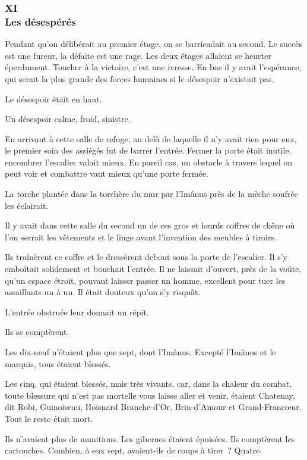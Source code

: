 \documentclass[french,twoside]{book} %
\begin{document}
 \subsubsection[{XI. Les désespérés}]{XI \\
Les désespérés}
\label{p3l4c11}
\noindent Pendant qu’on délibérait au premier étage, on se barricadait au second. Le succès est une fureur, la défaite est une rage. Les deux étages allaient se heurter éperdument. Toucher à la victoire, c’est une ivresse. En bas il y avait l’espérance, qui serait la plus grande des forces humaines si le désespoir n’existait pas.\par
Le désespoir était en haut.\par
Un désespoir calme, froid, sinistre.\par
En arrivant à cette salle de refuge, au delà de laquelle il n’y avait rien pour eux, le premier soin des assiégés fut de barrer l’entrée. Fermer la porte était inutile, encombrer l’escalier valait mieux. En pareil cas, un obstacle à travers lequel on peut voir et combattre vaut mieux qu’une porte fermée.\par
La torche plantée dans la torchère du mur par l’Imânus près de la mèche soufrée les éclairait.\par
Il y avait dans cette salle du second un de ces gros et lourds coffres de chêne où l’on serrait les vêtements et le linge avant l’invention des meubles à tiroirs.\par
Ils traînèrent ce coffre et le dressèrent debout sous  la porte de l’escalier. Il s’y emboîtait solidement et bouchait l’entrée. Il ne laissait d’ouvert, près de la voûte, qu’un espace étroit, pouvant laisser passer un homme, excellent pour tuer les assaillants un à un. Il était douteux qu’on s’y risquât.\par
L’entrée obstruée leur donnait un répit.\par
Ils se comptèrent.\par
Les dix-neuf n’étaient plus que sept, dont l’Imânus. Excepté l’Imânus et le marquis, tous étaient blessés.\par
Les cinq, qui étaient blessés, mais très vivants, car, dans la chaleur du combat, toute blessure qui n’est pas mortelle vous laisse aller et venir, étaient Chatenay, dit Robi, Guinoiseau, Hoisnard Branche-d’Or, Brin-d’Amour et Grand-Francœur. Tout le reste était mort.\par
Ils n’avaient plus de munitions. Les gibernes étaient épuisées. Ils comptèrent les cartouches. Combien, à eux sept, avaient-ils de coups à tirer ? Quatre.\par
\end{document}
